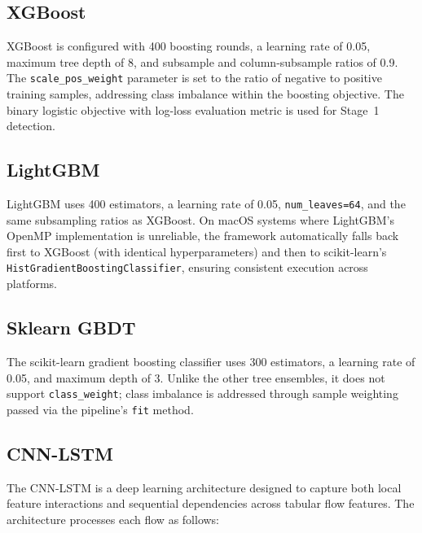 \documentclass[12pt,a4paper]{report}
\begin{document}
\subsection{XGBoost}
\label{sec:xgboost}

XGBoost is configured with 400 boosting rounds, a learning rate of 0.05, maximum tree depth of 8, and subsample and column-subsample ratios of 0.9. The \texttt{scale\_pos\_weight} parameter is set to the ratio of negative to positive training samples, addressing class imbalance within the boosting objective. The binary logistic objective with log-loss evaluation metric is used for Stage~1 detection.

\subsection{LightGBM}
\label{sec:lightgbm}

LightGBM uses 400 estimators, a learning rate of 0.05, \texttt{num\_leaves=64}, and the same subsampling ratios as XGBoost. On macOS systems where LightGBM's OpenMP implementation is unreliable, the framework automatically falls back first to XGBoost (with identical hyperparameters) and then to scikit-learn's \texttt{HistGradientBoostingClassifier}, ensuring consistent execution across platforms.

\subsection{Sklearn GBDT}
\label{sec:gbdt}

The scikit-learn gradient boosting classifier uses 300 estimators, a learning rate of 0.05, and maximum depth of 3. Unlike the other tree ensembles, it does not support \texttt{class\_weight}; class imbalance is addressed through sample weighting passed via the pipeline's \texttt{fit} method.

\subsection{CNN-LSTM}
\label{sec:cnnlstm}

The CNN-LSTM is a deep learning architecture designed to capture both local feature interactions and sequential dependencies across tabular flow features. The architecture processes each flow as follows:
\end{document}
